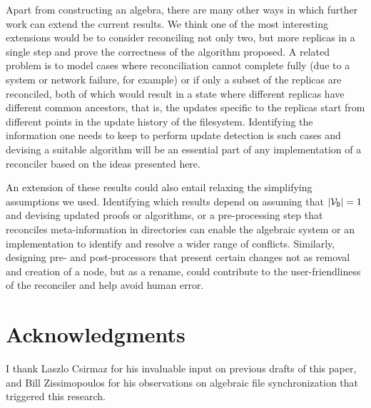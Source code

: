 \documentclass[12pt]{article}
\begin{document}
Apart from constructing an algebra,
there are many other ways in which further work can extend the current results.
We think one of the most interesting extensions would be to
consider reconciling not only two, but more replicas in a single step and
prove the correctness of the algorithm proposed.
A related problem is to model cases where reconciliation cannot
complete fully (due to a system or network failure, for example)
or if only a subset of the replicas are reconciled,
both of which would result in a state where different replicas
have different common ancestors, that is,
the updates specific to the replicas start from different points
in the update history of the filesystem.
Identifying the information one needs to keep to perform
update detection is such cases and devising a suitable algorithm
will be an essential part of any implementation of a reconciler
based on the ideas presented here.

An extension of these results could also entail relaxing
the simplifying assumptions we used.
Identifying which results depend on assuming that $|\mathcal{V}_{\mathtt{D}}|=1$
and devising updated proofs or algorithms,
or a pre-processing step that reconciles meta-information in directories
can enable the algebraic system or an implementation
to identify and resolve a wider range of conflicts.
Similarly, designing pre- and post-processors that
present certain changes not as removal and creation of a node,
but as a rename,
could contribute to the user-friendliness of the reconciler
and help avoid human error.


\section{Acknowledgments}

I thank Laszlo Csirmaz for his invaluable input on previous drafts of this paper,
and Bill Zissimopoulos for his observations on algebraic file synchronization that triggered this research.



\begin{thebibliography}{99}



\end{thebibliography}
\end{document}
